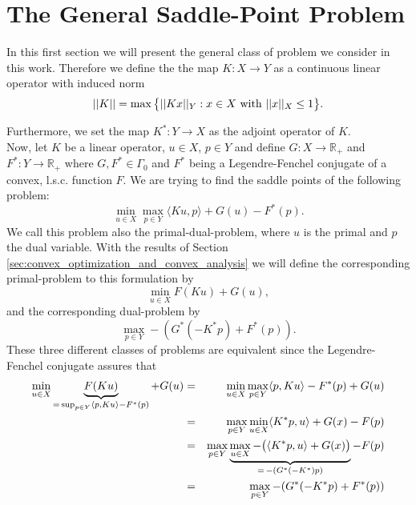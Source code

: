 \section{The General Saddle-Point Problem} %
\label{sec:the_general_saddle_point_problem}
    
    In this first section we will present the general class of problem we consider in this work. Therefore we define the the map $K: X \longrightarrow Y$ as a continuous linear operator with induced norm
        \begin{equation}
            ||K|| = \max \big\{ ||Kx||_{Y} : x \in X \,\, \textnormal{with} \,\, ||x||_{X} \le 1 \big\}.
            \label{eq:operator_norm}
        \end{equation}

    Furthermore, we set the map $K^{\ast}: Y \longrightarrow X$ as the adjoint operator of $K$.\\
    Now, let $K$ be a linear operator, $u \in X$, $p \in Y$ and define $G: X \longrightarrow \mathbb{R}_{+}$ and $F^{\ast}: Y \longrightarrow \mathbb{R}_{+}$ where $G, F^{\ast} \in \Gamma_{0}$ and $F^{\ast}$ being a Legendre-Fenchel conjugate of a convex, l.s.c. function $F$. We are trying to find the saddle points of the following problem:
        \begin{equation}
            \min_{u \in X} \max_{p \in Y} \langle Ku, p \rangle + G(u) - F^{\ast}(p).
            \label{eq:the_saddle_point_problem}
        \end{equation}
    We call this problem also the primal-dual-problem, where $u$ is the primal and $p$ the dual variable. With the results of Section \ref{sec:convex_optimization_and_convex_analysis} we will define the corresponding primal-problem to this formulation by
        \begin{equation}
            \min_{u \in X} F(Ku) + G(u),
            \label{eq:primal_problem}
        \end{equation}
    and the corresponding dual-problem by
        \begin{equation}
            \max_{p \in Y} -(G^{\ast}(-K^{\ast}p) + F^{\ast}(p)).
            \label{eq:dual_problem}
        \end{equation}
    These three different classes of problems are equivalent since the Legendre-Fenchel conjugate assures that
        \begin{eqnarray}
            \min_{u \in X} \underbrace{F(Ku)}_{=\, \sup_{p \in Y} \langle p, Ku \rangle - F^{\ast}(p)} + G(u) &=& \min_{u \in X} \max_{p \in Y} \langle p, Ku \rangle - F^{\ast}(p) + G(u) \notag \\
            &=& \max_{p \in Y} \min_{u \in X} \langle K^{\ast}p, u \rangle + G(x) - F(p) \notag \\
            &=& \max_{p \in Y} \underbrace{\max_{u \in X} -\big( \langle K^{\ast}p, u \rangle + G(x) \big)}_{=\, -(G^{\ast}(-K^{\ast})p)} - F(p) \notag \\
            &=& \max_{p \in Y} -(G^{\ast}(-K^{\ast}p) + F^{\ast}(p))
            \label{eq:swap_min_to_max}
        \end{eqnarray}

